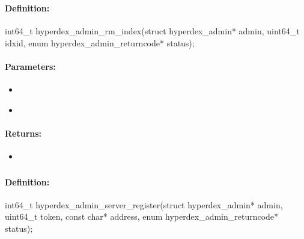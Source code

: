 \pagebreak
\subsubsection{}
\label{api:c:rm_index}


\paragraph{Definition:}
\begin{ccode}
int64_t hyperdex_admin_rm_index(struct hyperdex_admin* admin,
        uint64_t idxid,
        enum hyperdex_admin_returncode* status);
\end{ccode}

\paragraph{Parameters:}
\begin{itemize}[noitemsep]
\item {}\\

\item {}\\

\end{itemize}

\paragraph{Returns:}
\begin{itemize}[noitemsep]
\item {}\\

\end{itemize}

\pagebreak
\subsubsection{}
\label{api:c:server_register}


\paragraph{Definition:}
\begin{ccode}
int64_t hyperdex_admin_server_register(struct hyperdex_admin* admin,
        uint64_t token,
        const char* address,
        enum hyperdex_admin_returncode* status);
\end{ccode}

